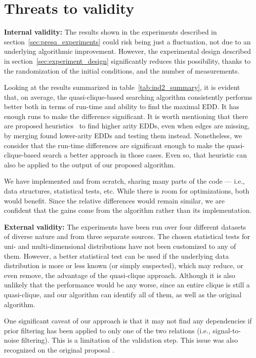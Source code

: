 \section{Threats to validity}
\label{sec:threats}

\textbf{Internal validity:} The results shown in the
experiments described in section~\ref{sec:presq_experiments} could risk being just a fluctuation,
not due to an underlying algorithmic improvement. However,
the experimental design described in section~\ref{sec:experiment_design} significantly reduces
this possibility, thanks to the randomization of the initial conditions,
and the number of measurements.

Looking at the results summarized in table~\ref{tab:ind2_summary},
it is evident that, on average, the quasi-clique-based searching algorithm consistently performs
better both in terms of run-time and ability to find the maximal EDD.
It has enough runs to make the difference significant.
It is worth mentioning that there are proposed heuristics~\cite{koeller2003discovery} to find higher
arity \glspl{EDD}, even when edges are missing, by merging found lower-arity \glspl{EDD} and testing them
instead.
Nonetheless, we consider that the run-time differences are significant enough to make
the quasi-clique-based search a better approach in those cases.
Even so, that heuristic can also be applied to the output of our proposed algorithm.

We have implemented \Find and \PresQ from scratch, sharing 
many parts of the code --- i.e., data structures, statistical tests, etc.
While there is room for optimizations, both would benefit.
Since the relative differences would remain similar, we are confident that the gains come from the 
algorithm rather than its implementation.

\textbf{External validity:} The experiments have been run over four different datasets of
diverse nature and from three separate sources. The chosen statistical tests for
uni- and multi-dimensional distributions have not been customized to any of them.
However, a better statistical test can be used if the underlying data distribution is more or
less known (or simply suspected), which may reduce, or even remove, the advantage of the
quasi-clique approach. Although it is also unlikely that the performance would be any worse,
since an entire clique is still a quasi-clique, and our algorithm can identify all of them, as
well as the original \Find algorithm.

One significant caveat of our approach is that it may not find
any dependencies if prior filtering has been applied to only one of the two relations
(i.e., signal-to-noise filtering). This is a limitation of the validation
step. This issue was also recognized on the original \Find proposal \cite{koeller2003discovery}.